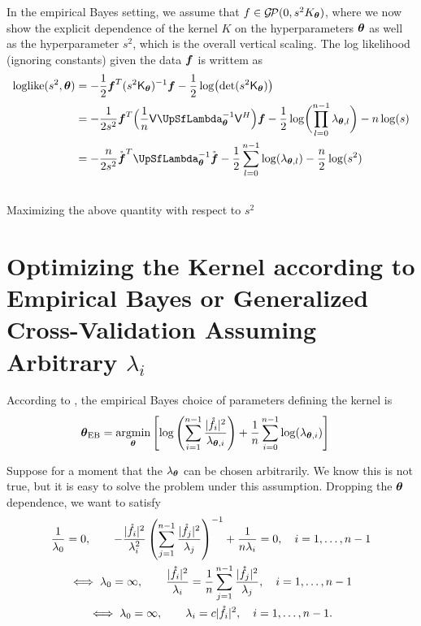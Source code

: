 \documentclass{amsart}
\newcommand{\rvf}{\mathring{\vf}}
\newcommand{\gp}{\mathcal{G}\!\mathcal{P}}
\begin{document}
In the empirical Bayes setting, we assume that $f \in \gp(0,s^2K_{\vtheta})$, where we now show the explicit dependence of the
kernel $K$ on the hyperparameters $\boldsymbol{\theta}$ as well as the hyperparameter $s^2$, which is the overall vertical scaling.  
The log likelihood (ignoring constants) given the data $\boldsymbol{f}$ is writtem as 
\begin{align}
	\text{loglike}(s^2,\vtheta) 
	& = - \frac 1{2} \vf^T (s^2\mK_{\vtheta})^{-1}\vf - \frac 12 \log\bigl(\det(s^2 \mK_{\vtheta})\bigr)  \\
	\nonumber 
	& = - \frac 1{2 s^2} \vf^T\Bigl(\frac 1n \mV \mLambda_{\vtheta}^{-1} \mV^H \Bigr)\vf 
	- \frac 12 \log\biggl(\prod_{l=0}^{n-1} \lambda_{\vtheta,l}\biggr) - n \log(s)  \\
	\nonumber 
	& = - \frac n{2 s^2} \rvf^T\mLambda_{\vtheta}^{-1} \rvf 
- \frac 12 \sum_{l=0}^{n-1} \log(\lambda_{\vtheta,l}) - \frac{n}2 \log(s^2)  \\
\nonumber 
\end{align}
Maximizing the above quantity with respect to $s^2$ 



\section{Optimizing the Kernel according to Empirical Bayes or Generalized Cross-Validation Assuming Arbitrary $\lambda_i$}
According to \cite{RatHic19a}, the empirical Bayes choice of parameters defining the kernel is
\begin{align*}
    \boldsymbol{\theta}_{\text{EB}} 
    &= \operatorname*{argmin}_{\boldsymbol{\theta}} \left [\log\left( \sum_{i=1}^{n-1} \frac{\lvert\mathring{f}_i\rvert^2}{\lambda_{\boldsymbol{\theta},i}} \right)
    + \frac 1n \sum_{i=0}^{n-1} \log(\lambda_{\boldsymbol{\theta},i} ) \right ]
\end{align*}

Suppose for a moment that the $\lambda_{\boldsymbol{\theta}}$ can be chosen arbitrarily.   We know this is not true, but it is easy to solve the problem under this assumption.  Dropping the $\boldsymbol{\theta}$ dependence, we want to satisfy
\begin{gather*}
    \frac 1{\lambda_0} = 0, \qquad 
    - \frac{\lvert\mathring{f}_i\rvert^2}{\lambda_{i}^2} \left( \sum_{j=1}^{n-1} \frac{\lvert\mathring{f}_j\rvert^2}{\lambda_{j}} \right)^{-1} + \frac 1{n\lambda_i} = 0, \quad i = 1, \ldots, n-1
    \\
    \iff
    \lambda_0 = \infty, \qquad \frac{\lvert\mathring{f}_i\rvert^2}{\lambda_{i}} = \frac 1n \sum_{j=1}^{n-1} \frac{\lvert\mathring{f}_j\rvert^2}{\lambda_{j}}, \quad i = 1, \ldots, n-1
    \\
    \iff
    \lambda_0 = \infty, \qquad \lambda_i = c \lvert\mathring{f}_i\rvert^2, \quad i = 1, \ldots, n-1.
\end{gather*}
\end{document}
